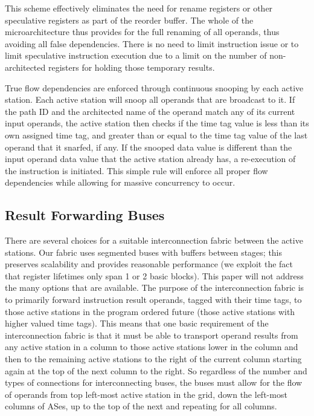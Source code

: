 \documentclass[10pt,twocolumn,dvips]{article}
\begin{document}
This scheme effectively eliminates the need for rename registers
or other speculative registers as part of the reorder buffer.
The whole of the microarchitecture thus provides for the full renaming
of all operands, thus avoiding all false dependencies.
There is no need to limit instruction issue or to limit speculative
instruction execution due to a limit on the number of non-architected
registers for holding those temporary results.

True flow dependencies are enforced through continuous  
snooping by each active station.  Each active station
will snoop all operands that are broadcast to it.  If the
path ID and the architected name of the operand match any of
its current input operands, the active station then checks
if the time tag value is less than its own assigned time tag,
and greater than or equal to the time tag value of the last
operand that it snarfed, if any.  If the snooped data value is
different than the input operand data value that the active
station already has, a re-execution of the instruction is initiated.
This simple rule will enforce
all proper flow dependencies while allowing for massive
concurrency to occur.
\vspace{-0.2in}
\subsection{Result Forwarding Buses}
\vspace{-0.1in}
There are several choices for a suitable interconnection fabric between
the active stations.  Our fabric uses segmented buses with buffers
between stages; this preserves
scalability and provides reasonable performance (we exploit the fact
that register lifetimes only span 1 or 2 basic blocks).
This paper will not address the
many options that are available.  The purpose of the
interconnection fabric is to primarily forward instruction result
operands, tagged with their time tags, 
to those active stations in the program ordered future (those
active stations with higher valued time tags).  This means that one
basic requirement of the interconnection fabric is that it must be able
to transport operand results from any active station in a column to
those active stations lower in the column and then to the remaining
active stations to the right of the current column starting again at
the top of the next column to the right.  So regardless of the number
and types of connections for interconnecting buses, the buses must
allow for the flow of operands from top left-most active station in the
grid, down the left-most columns of ASes, up to the top of the next and
repeating for all columns.
\end{document}
